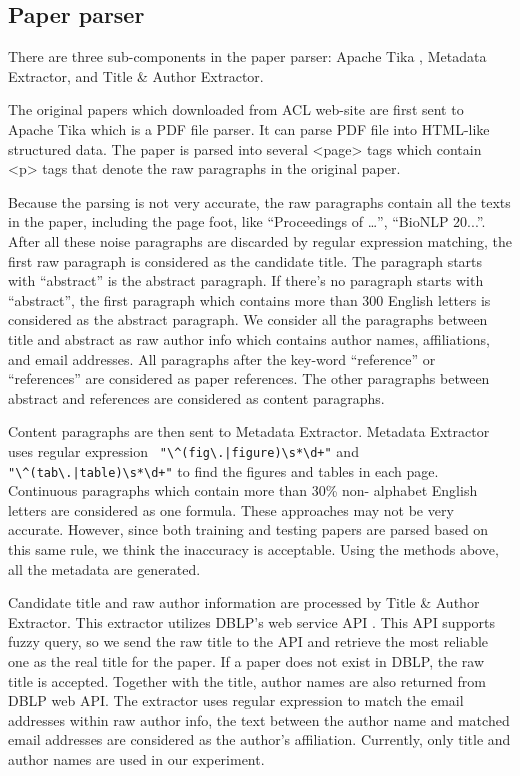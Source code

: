 \documentclass[11pt,letterpaper]{article}
\begin{document}
\subsection{Paper parser}

There are three sub-components in the paper parser: Apache Tika , Metadata Extractor, and Title \& Author Extractor. 

The original papers which downloaded from ACL web-site are first sent to Apache Tika which is a PDF file parser. It can parse PDF file into HTML-like structured data. The paper is parsed into several <page> tags which contain <p> tags that denote the raw paragraphs in the original paper. 

Because the parsing is not very accurate, the raw paragraphs contain all the texts in the paper, including the page foot, like ``Proceedings of …'', ``BioNLP 20...''. After all these noise paragraphs are discarded by regular expression matching, the first raw paragraph is considered as the candidate title. The paragraph starts with ``abstract'' is the abstract paragraph. If there’s no paragraph starts with ``abstract'', the first paragraph which contains more than 300 English letters is considered as the abstract paragraph. 
We consider all the paragraphs between title and abstract as raw author info which contains author names, affiliations, and email addresses. All paragraphs after the key-word ``reference'' or ``references'' are considered as paper references. The other paragraphs between abstract and references are considered as content paragraphs. 

Content paragraphs are then sent to Metadata Extractor. Metadata Extractor uses regular expression \verb- "\^(fig\.|figure)\s*\d+"- and  \verb-"\^(tab\.|table)\s*\d+"- to find the figures and tables in each page. Continuous paragraphs which contain more than 30\% non- alphabet English letters are considered as one formula. These approaches may not be very accurate. However, since both training and testing papers are parsed based on this same rule, we think the inaccuracy is acceptable. Using the methods above, all the metadata are generated. 

Candidate title and raw author information are processed by Title \& Author Extractor. This extractor utilizes DBLP’s web service API . This API supports fuzzy query, so we send the raw title to the API and retrieve the most reliable one as the real title for the paper. If a paper does not exist in DBLP, the raw title is accepted. Together with the title, author names are also returned from DBLP web API. The extractor uses regular expression to match the email addresses within raw author info, the text between the author name and matched email addresses are considered as the author’s affiliation. Currently, only title and author names are used in our experiment. 
\end{document}
